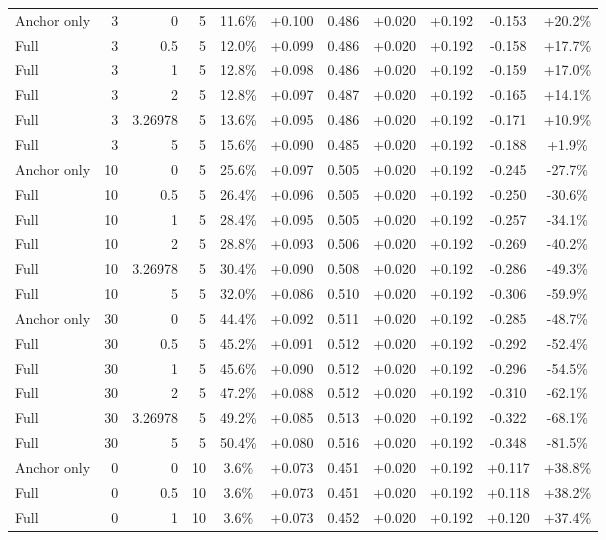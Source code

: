 \begin{table}[htbp]
\begin{tabular}{lrrrccccccc}
Anchor only & 3 & 0 & 5 & 11.6\% & +0.100 & 0.486 & +0.020 & +0.192 & -0.153 & +20.2\% \\
Full & 3 & 0.5 & 5 & 12.0\% & +0.099 & 0.486 & +0.020 & +0.192 & -0.158 & +17.7\% \\
Full & 3 & 1 & 5 & 12.8\% & +0.098 & 0.486 & +0.020 & +0.192 & -0.159 & +17.0\% \\
Full & 3 & 2 & 5 & 12.8\% & +0.097 & 0.487 & +0.020 & +0.192 & -0.165 & +14.1\% \\
Full & 3 & 3.26978 & 5 & 13.6\% & +0.095 & 0.486 & +0.020 & +0.192 & -0.171 & +10.9\% \\
Full & 3 & 5 & 5 & 15.6\% & +0.090 & 0.485 & +0.020 & +0.192 & -0.188 & +1.9\% \\
Anchor only & 10 & 0 & 5 & 25.6\% & +0.097 & 0.505 & +0.020 & +0.192 & -0.245 & -27.7\% \\
Full & 10 & 0.5 & 5 & 26.4\% & +0.096 & 0.505 & +0.020 & +0.192 & -0.250 & -30.6\% \\
Full & 10 & 1 & 5 & 28.4\% & +0.095 & 0.505 & +0.020 & +0.192 & -0.257 & -34.1\% \\
Full & 10 & 2 & 5 & 28.8\% & +0.093 & 0.506 & +0.020 & +0.192 & -0.269 & -40.2\% \\
Full & 10 & 3.26978 & 5 & 30.4\% & +0.090 & 0.508 & +0.020 & +0.192 & -0.286 & -49.3\% \\
Full & 10 & 5 & 5 & 32.0\% & +0.086 & 0.510 & +0.020 & +0.192 & -0.306 & -59.9\% \\
Anchor only & 30 & 0 & 5 & 44.4\% & +0.092 & 0.511 & +0.020 & +0.192 & -0.285 & -48.7\% \\
Full & 30 & 0.5 & 5 & 45.2\% & +0.091 & 0.512 & +0.020 & +0.192 & -0.292 & -52.4\% \\
Full & 30 & 1 & 5 & 45.6\% & +0.090 & 0.512 & +0.020 & +0.192 & -0.296 & -54.5\% \\
Full & 30 & 2 & 5 & 47.2\% & +0.088 & 0.512 & +0.020 & +0.192 & -0.310 & -62.1\% \\
Full & 30 & 3.26978 & 5 & 49.2\% & +0.085 & 0.513 & +0.020 & +0.192 & -0.322 & -68.1\% \\
Full & 30 & 5 & 5 & 50.4\% & +0.080 & 0.516 & +0.020 & +0.192 & -0.348 & -81.5\% \\
Anchor only & 0 & 0 & 10 & 3.6\% & +0.073 & 0.451 & +0.020 & +0.192 & +0.117 & +38.8\% \\
Full & 0 & 0.5 & 10 & 3.6\% & +0.073 & 0.451 & +0.020 & +0.192 & +0.118 & +38.2\% \\
Full & 0 & 1 & 10 & 3.6\% & +0.073 & 0.452 & +0.020 & +0.192 & +0.120 & +37.4\% \\

\end{tabular}
\end{table}
